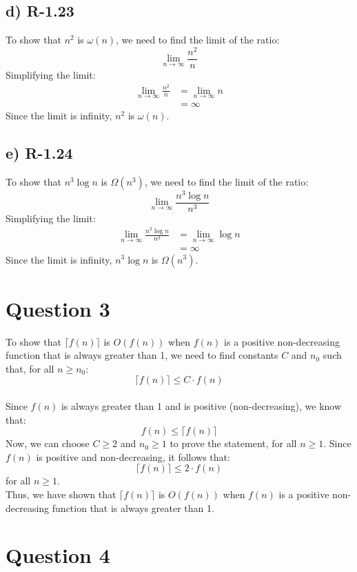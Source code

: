 \documentclass[12pt, letterpaper]{article}
\begin{document}
\subsection{d) R-1.23}
To show that \(n^2\) is \(\omega(n)\), we need to find the limit of the ratio:
\[
\lim_{{n \to \infty}} \frac{n^2}{n}
\]
Simplifying the limit:
\[
\begin{align*}
\lim_{{n \to \infty}} \frac{n^2}{n} &= \lim_{{n \to \infty}} n \\
&= \infty
\end{align*}
\]
Since the limit is infinity, \(n^2\) is \(\omega(n)\).

\subsection{e) R-1.24}
To show that \(n^3 \log n\) is \(\Omega(n^3)\), we need to find the limit of the ratio:
\[
\lim_{{n \to \infty}} \frac{n^3 \log n}{n^3}
\]
Simplifying the limit:
\[
\begin{align*}
\lim_{{n \to \infty}} \frac{n^3 \log n}{n^3} &= \lim_{{n \to \infty}} \log n \\
&= \infty
\end{align*}
\]
Since the limit is infinity, \(n^3 \log n\) is \(\Omega(n^3)\).

\newpage

\section{Question 3}
To show that \(\lceil f(n) \rceil\) is \(O(f(n))\) when \(f(n)\) is a positive non-decreasing function that is always greater than 1, we need to find constants \(C\) and \(n_0\) such that, for all \(n \geq n_0\):
\[
\lceil f(n) \rceil \leq C \cdot f(n)
\]
\\
Since \(f(n)\) is always greater than 1 and is positive (non-decreasing), we know that:
\[
f(n) \leq \lceil f(n) \rceil
\]
Now, we can choose \(C \geq 2\) and \(n_0 \geq 1\) to prove the statement,
for all \(n \geq 1\). Since \(f(n)\) is positive and non-decreasing, it follows that:
\[
\lceil f(n) \rceil \leq 2 \cdot f(n)
\]
for all \(n \geq 1\).\\
Thus, we have shown that \(\lceil f(n) \rceil\) is \(O(f(n))\) when \(f(n)\) is a positive non-decreasing function that is always greater than 1.
\newpage

\section{Question 4}
\end{document}
